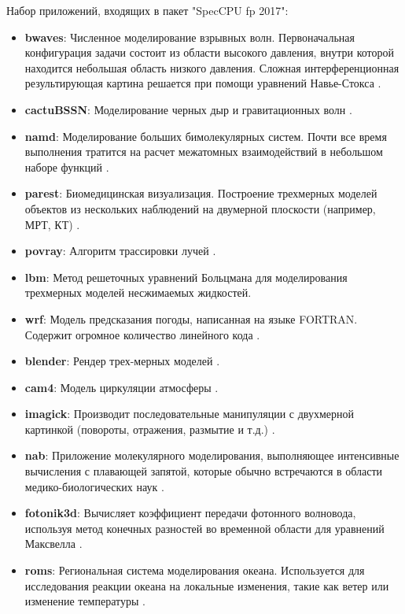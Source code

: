 Набор приложений, входящих в пакет "SpecCPU fp 2017"\phantom{}:
\begin{itemize}
	\item  \textbf{bwaves}:  Численное  моделирование взрывных волн. Первоначальная конфигурация задачи состоит из области высокого давления,  внутри которой находится небольшая область низкого давления. Сложная интерференционная  результирующая картина  решается при помощи уравнений Навье-Стокса \cite{auer1983intracranial}.
	\item  \textbf{cactuBSSN}: Моделирование черных дыр и гравитационных волн \cite{allen2007scientific}.
	\item  \textbf{namd}: Моделирование больших бимолекулярных систем. Почти все время выполнения тратится на расчет межатомных взаимодействий в небольшом наборе функций \cite{phillips2002namd}.
	\item  \textbf{parest}: Биомедицинская визуализация. Построение трехмерных моделей объектов из нескольких наблюдений на двумерной плоскости (например, МРТ, КТ) \cite{hoon2007fully}.
	\item  \textbf{povray}: Алгоритм трассировки лучей \cite{plachetka1998pov}.
	\item  \textbf{lbm}: Метод решеточных уравнений Больцмана для моделирования трехмерных моделей несжимаемых жидкостей.
	\item  \textbf{wrf}: Модель предсказания погоды, написанная на языке FORTRAN. Содержит огромное количество линейного кода \cite{skamarock2019description}. 
 	\item  \textbf{blender}: Рендер трех-мерных моделей \cite{brito2007blender}. 
 	\item  \textbf{cam4}: Модель циркуляции атмосферы \cite{neale2013mean}. 
 	\item  \textbf{imagick}: Производит последовательные манипуляции с двухмерной картинкой (повороты, отражения, размытие и т.д.) \cite{still2006definitive}. 
 	\item  \textbf{nab}: Приложение молекулярного моделирования, выполняющее интенсивные вычисления с плавающей запятой, которые обычно встречаются в области медико-биологических наук \cite{povcanic2009nab}. 
 	\item  \textbf{fotonik3d}: Вычисляет коэффициент передачи фотонного волновода, используя метод конечных разностей во временной области для уравнений Максвелла \cite{sullivan2013electromagnetic}.
 	\item  \textbf{roms}: Региональная система моделирования океана. Используется для исследования реакции океана на локальные изменения, такие как ветер или изменение температуры \cite{haidvogel2008ocean}. 
\end{itemize}



